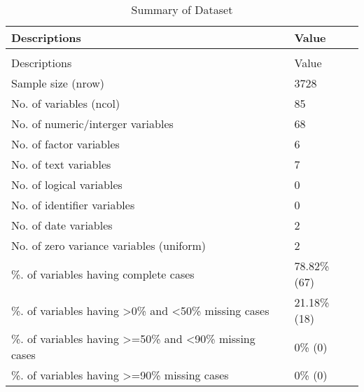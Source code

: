 \begingroup\fontsize{9}{11}\selectfont

\begin{longtable}[t]{ll}
\caption{Summary of Dataset}\\
\toprule
Descriptions & Value\\
\midrule
\endfirsthead
\caption[]{Summary of Dataset }\\
\toprule
Descriptions & Value\\
\midrule
\endhead

\endfoot
\bottomrule
\endlastfoot
Sample size (nrow) & 3728\\
No. of variables (ncol) & 85\\
No. of numeric/interger variables & 68\\
No. of factor variables & 6\\
No. of text variables & 7\\
No. of logical variables & 0\\
No. of identifier variables & 0\\
No. of date variables & 2\\
No. of zero variance variables (uniform) & 2\\
\%. of variables having complete cases & 78.82\% (67)\\
\%. of variables having >0\% and <50\% missing cases & 21.18\% (18)\\
\%. of variables having >=50\% and <90\% missing cases & 0\% (0)\\
\%. of variables having >=90\% missing cases & 0\% (0)\\*
\end{longtable}
\endgroup{}
